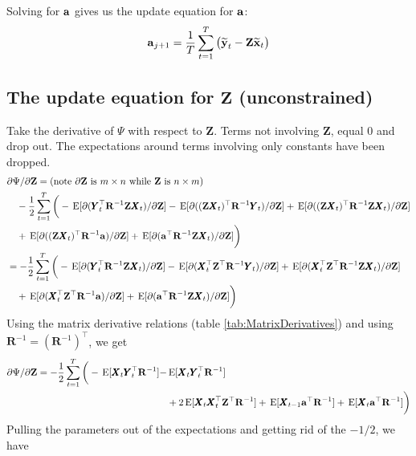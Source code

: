 \documentclass[]{article}
\def\XI{\mbox{\boldmath $\Xi$}}
\def\E{\,\textup{\textrm{E}}}
\def\RR{\mbox{$\mathbf R$}}	 \def\rr{\mbox{$\mathbf r$}} \def\Rb{\mbox{$\mathbf H$}}	\def\Rm{\mathbb{R}}
\def\XX{\mbox{$\pmb{X}$}}	\def\xx{\mbox{$\pmb{x}$}}
\def\YY{\mbox{$\pmb{Y}$}}	\def\yy{\mbox{$\pmb{y}$}}
\def\ZZ{\mbox{$\mathbf Z$}}	\def\zz{\mbox{$\mathbf z$}}	\def\Zb{\mbox{$\mathbf M$}} \def\Za{\mbox{$\mathbf N$}} \def\Zm{\XI}
\def\hatxt{\widetilde{\mbox{$\mathbf x$}}_t}
\def\hatyt{\widetilde{\mbox{$\mathbf y$}}_t}
\begin{document}
Solving for $\aa$ gives us the update equation for $\aa$: 
\begin{equation}\label{eq:a.update.unconstrained}
\aa_{j+1} = \frac{1}{T}\sum_{t=1}^{T}\big(\hatyt - \ZZ\hatxt \big)
\end{equation}

\subsection{The update equation for $\ZZ$ (unconstrained)}
Take the derivative of $\Psi$  with respect to $\ZZ$.  Terms not involving $\ZZ$, equal 0 and drop out. The expectations around terms involving only constants have been dropped. 
\begin{equation}\label{eq:Z.unconstrained1}
\begin{split}
&\partial\Psi/\partial\ZZ = \text{(note $\partial\ZZ$ is $m \times n$ while $\ZZ$ is $n \times m$)}\\
&\quad -\frac{1}{2} \sum_{t=1}^T\bigg(-\E[\partial(\YY_t^\top\RR^{-1}\ZZ\XX_t)/\partial\ZZ] 
 - \E[\partial((\ZZ\XX_t)^\top\RR^{-1}\YY_t)/\partial\ZZ] + \E[\partial((\ZZ\XX_t)^\top\RR^{-1}\ZZ\XX_t)/\partial\ZZ] \\
&\quad +  \E[\partial((\ZZ\XX_t)^\top\RR^{-1}\aa)/\partial\ZZ] 
+ \E[\partial(\aa^\top\RR^{-1}\ZZ\XX_t)/\partial\ZZ]\bigg)\\
&= -\frac{1}{2} \sum_{t=1}^T\bigg(-\E[\partial(\YY_t^\top\RR^{-1}\ZZ\XX_t)/\partial\ZZ] 
 -\E[\partial(\XX_t^\top\ZZ^\top\RR^{-1}\YY_t)/\partial\ZZ] 
+ \E[\partial(\XX_t^\top\ZZ^\top\RR^{-1}\ZZ\XX_t)/\partial\ZZ]  \\
&\quad + \E[\partial(\XX_t^\top\ZZ^\top\RR^{-1}\aa)/\partial\ZZ] 
+ \E[\partial(\aa^\top\RR^{-1}\ZZ\XX_t)/\partial\ZZ]\bigg)\\
\end{split}
\end{equation}
Using the matrix derivative relations (table \ref{tab:MatrixDerivatives}) and using $\RR^{-1} = (\RR^{-1})^\top$, we get 
\begin{equation}\label{eq:Z.unconstrained2}
\begin{split}
\partial\Psi/\partial\ZZ = -\frac{1}{2} \sum_{t=1}^T\bigg(-\E[ \XX_t\YY_t^\top\RR^{-1} ] - &\E[ \XX_t\YY_t^\top\RR^{-1} ]  \\
&+ 2 \E[\XX_t\XX_t^\top\ZZ^\top\RR^{-1}] + \E[ \XX_{t-1}\aa^\top\RR^{-1} ]  + \E[ \XX_t\aa^\top\RR^{-1} ] \bigg) 
\end{split}
\end{equation}
Pulling the parameters out of the expectations and getting rid of the $-1/2$, we have
\end{document}
